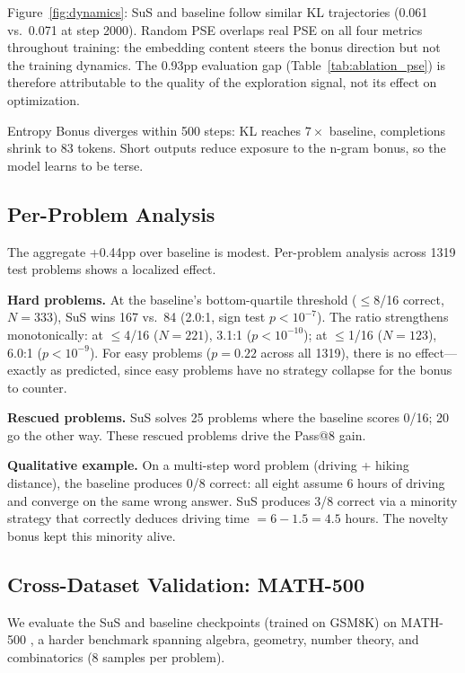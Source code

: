 \documentclass[10pt]{article}
\begin{document}
Figure~\ref{fig:dynamics}: SuS and baseline follow similar KL trajectories (0.061 vs.\ 0.071 at step 2000). Random PSE overlaps real PSE on all four metrics throughout training: the embedding content steers the bonus direction but not the training dynamics. The 0.93pp evaluation gap (Table~\ref{tab:ablation_pse}) is therefore attributable to the quality of the exploration signal, not its effect on optimization.

Entropy Bonus diverges within 500 steps: KL reaches $7{\times}$ baseline, completions shrink to 83 tokens. Short outputs reduce exposure to the n-gram bonus, so the model learns to be terse.

\subsection{Per-Problem Analysis}
\label{sec:perproblem}

The aggregate +0.44pp over baseline is modest. Per-problem analysis across 1319 test problems shows a localized effect.

\textbf{Hard problems.} At the baseline's bottom-quartile threshold ($\leq$8/16 correct, $N{=}333$), SuS wins 167 vs.\ 84 (2.0:1, sign test $p < 10^{-7}$). The ratio strengthens monotonically: at $\leq$4/16 ($N{=}221$), 3.1:1 ($p < 10^{-10}$); at $\leq$1/16 ($N{=}123$), 6.0:1 ($p < 10^{-9}$). For easy problems ($p{=}0.22$ across all 1319), there is no effect---exactly as predicted, since easy problems have no strategy collapse for the bonus to counter.

\textbf{Rescued problems.} SuS solves 25 problems where the baseline scores 0/16; 20 go the other way. These rescued problems drive the Pass@8 gain.

\textbf{Qualitative example.} On a multi-step word problem (driving + hiking distance), the baseline produces 0/8 correct: all eight assume 6 hours of driving and converge on the same wrong answer. SuS produces 3/8 correct via a minority strategy that correctly deduces driving time $= 6 - 1.5 = 4.5$ hours. The novelty bonus kept this minority alive.

\subsection{Cross-Dataset Validation: MATH-500}
\label{sec:math500}

We evaluate the SuS and baseline checkpoints (trained on GSM8K) on MATH-500 \citep{hendrycks2021measuring}, a harder benchmark spanning algebra, geometry, number theory, and combinatorics (8 samples per problem).
\end{document}
